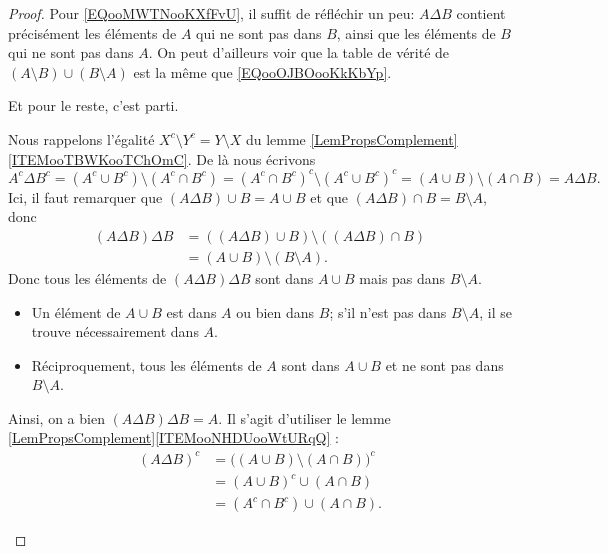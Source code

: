 \begin{proof}
	Pour \eqref{EQooMWTNooKXfFvU}, il suffit de réfléchir un peu: \( A\Delta B \) contient précisément les éléments de \( A \) qui ne sont pas dans \( B \), ainsi que les éléments de \( B \) qui ne sont pas dans \( A \). On peut d'ailleurs voir que la table de vérité de \( (A\setminus B)\cup (B\setminus A)\) est la même que \eqref{EQooOJBOooKkKbYp}.

	Et pour le reste, c'est parti.
	\begin{subproof}
		Nous rappelons l'égalité \( X^c\setminus Y^c=Y\setminus X\) du lemme \ref{LemPropsComplement}\ref{ITEMooTBWKooTChOmC}. De là nous écrivons
		\begin{equation}
			A^c\Delta B^c=(A^c\cup B^c)\setminus(A^c\cap B^c)=(A^c\cap B^c)^c\setminus(A^c\cup B^c)^c=(A\cup B)\setminus (A\cap B)=A\Delta B.
		\end{equation}
		Ici, il faut remarquer que \( (A\Delta B)\cup B=A\cup B\) et que \( (A\Delta B)\cap B=B\setminus A\), donc
		\begin{align}
			(A\Delta B)\Delta B & = ((A\Delta B)\cup B) \setminus ((A\Delta B)\cap B) \\
			                    & = (A\cup B)\setminus (B\setminus A).
		\end{align}
		Donc tous les éléments de \( (A\Delta B)\Delta B \) sont dans \( A \cup B \) mais pas dans \( B \setminus A \).
		\begin{itemize}
			\item
			      Un élément de \( A \cup B \) est dans \( A \) ou bien dans \( B \); s'il n'est pas dans \( B \setminus A \), il se trouve nécessairement dans \( A \).
			\item
			      Réciproquement, tous les éléments de \( A \) sont dans \( A \cup B \) et ne sont pas dans \( B \setminus A \).
		\end{itemize}
		Ainsi, on a bien \( (A\Delta B)\Delta B = A \).
		Il s'agit d'utiliser le lemme \ref{LemPropsComplement}\ref{ITEMooNHDUooWtURqQ} :
		\begin{subequations}
			\begin{align}
				(A\Delta B)^c & =\Big( (A\cup B)\setminus (A\cap B) \Big)^c \\
				              & =(A\cup B)^c  \cup(A\cap B)                 \\
				              & =(A^c\cap B^c)\cup(A\cap B).
			\end{align}

\end{subequations}
\end{subproof}
\end{proof}
